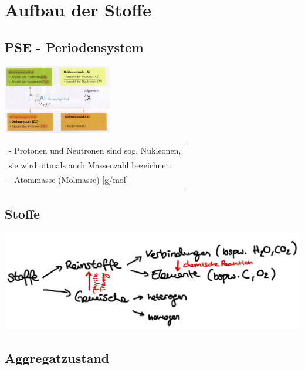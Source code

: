 \section{Aufbau der Stoffe}

\subsection{PSE - Periodensystem}
\begin{center}
	\includegraphics[height=3cm]{images/Nukleonenzahl.jpg}
\end{center}

\begin{tabular} {l}
	- Protonen und Neutronen sind sog. Nukleonen, \\
	sie wird oftmals auch Massenzahl bezeichnet. \\
	- Atommasse (Molmasse) [g/mol] \\
\end{tabular}

\subsection{Stoffe}	
\renewcommand{\arraystretch}{1.2}
\includegraphics[width=\columnwidth]{images/Stoffe_eigenschaften.PNG}

\subsection{Aggregatzustand}		

